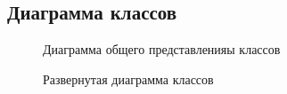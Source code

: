

\begin{landscape}
	\chapter{Диаграмма классов}
	\label{cha:appendix1}

	\begin{figure}
		\centering
		
		\caption{Диаграмма общего представленияы классов}
	\end{figure}

\end{landscape}

\begin{landscape}
	\begin{figure}
		\centering
		
		\caption{Развернутая диаграмма классов}
	\end{figure}
\end{landscape}


